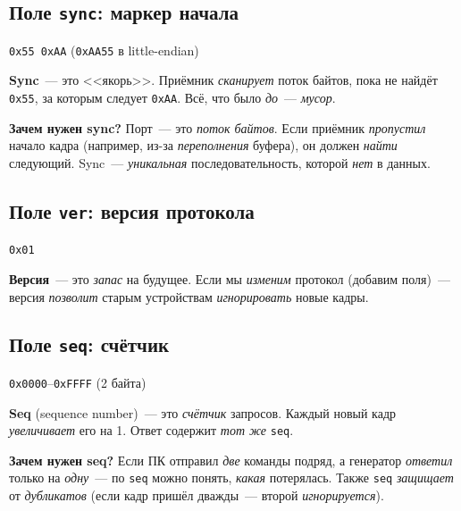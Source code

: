 \subsection{Поле \texttt{sync}: маркер начала}

\begin{center}
\texttt{0x55 0xAA} (\texttt{0xAA55} в little-endian)
\end{center}

\textbf{Sync}~--- это <<якорь>>. Приёмник \emph{сканирует}
поток байтов, пока не найдёт \texttt{0x55}, за которым
следует \texttt{0xAA}. Всё, что было \emph{до}~--- \emph{мусор}.

\begin{keybox}
\textbf{Зачем нужен sync?} Порт~--- это \emph{поток байтов}.
Если приёмник \emph{пропустил} начало кадра (например,
из-за \emph{переполнения} буфера), он должен \emph{найти}
следующий. Sync~--- \emph{уникальная} последовательность,
которой \emph{нет} в данных.
\end{keybox}

\subsection{Поле \texttt{ver}: версия протокола}

\begin{center}
\texttt{0x01}
\end{center}

\textbf{Версия}~--- это \emph{запас} на будущее. Если
мы \emph{изменим} протокол (добавим поля)~--- версия
\emph{позволит} старым устройствам \emph{игнорировать}
новые кадры.

\subsection{Поле \texttt{seq}: счётчик}

\begin{center}
\texttt{0x0000}--\texttt{0xFFFF} (2 байта)
\end{center}

\textbf{Seq} (sequence number)~--- это \emph{счётчик}
запросов. Каждый новый кадр \emph{увеличивает} его на 1.
Ответ содержит \emph{тот же} \texttt{seq}.

\begin{ideabox}
\textbf{Зачем нужен seq?} Если ПК отправил \emph{две}
команды подряд, а генератор \emph{ответил} только
на \emph{одну}~--- по \texttt{seq} можно понять,
\emph{какая} потерялась. Также \texttt{seq} \emph{защищает}
от \emph{дубликатов} (если кадр пришёл дважды~---
второй \emph{игнорируется}).
\end{ideabox}

